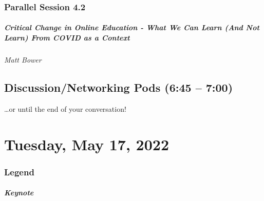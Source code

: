 \documentclass[
]{book}
\begin{document}
\hypertarget{parallel-session-4.2}{%
\subsection*{Parallel Session 4.2}\label{parallel-session-4.2}}

\begin{reflect}
\hypertarget{critical-change-in-online-education---what-we-can-learn-and-not-learn-from-covid-as-a-context}{%
\paragraph*{Critical Change in Online Education - What We Can Learn (And
Not Learn) From COVID as a
Context}\label{critical-change-in-online-education---what-we-can-learn-and-not-learn-from-covid-as-a-context}}

\emph{Matt Bower}
\end{reflect}

\hypertarget{discussionnetworking-pods-645-700}{%
\section*{Discussion/Networking Pods (6:45 -- 7:00)}\label{discussionnetworking-pods-645-700}}

\ldots or until the end of your conversation!

\hypertarget{tuesday-may-17-2022}{%
\chapter{Tuesday, May 17, 2022}\label{tuesday-may-17-2022}}

\hypertarget{legend-1}{%
\subsection*{Legend}\label{legend-1}}

\begin{reflect}
\hypertarget{keynote}{%
\paragraph{Keynote}\label{keynote}}
\end{reflect}
\end{document}
